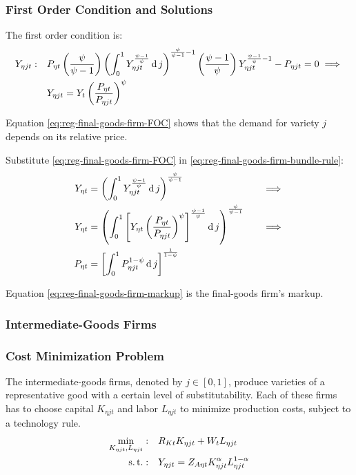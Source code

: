 \documentclass[../thesis.tex]{subfiles}
\begin{document}
\subsubsection*{First Order Condition and Solutions}

The first order condition is:
\begin{align}
	Y_{\eta jt}:\quad & P_{\eta t} \left( \frac{\psi}{\psi-1} \right) \left( \int_{0}^{1} Y_{\eta jt}^{\frac{\psi-1}{\psi}} \operatorname{d} j \right)^{\frac{\psi}{\psi-1}-1} \left( \frac{\psi-1}{\psi} \right) Y_{\eta jt}^{\frac{\psi-1}{\psi}-1} - P_{\eta jt} = 0 \implies \nonumber \\
	\label{eq:reg-final-goods-firm-FOC}
	& Y_{\eta jt} = Y_{t} \left( \frac{P_{\eta t}}{P_{\eta jt}} \right)^{\psi}
\end{align}

Equation \ref{eq:reg-final-goods-firm-FOC} shows that the demand for variety $j$ depends on its relative price. 

Substitute \ref{eq:reg-final-goods-firm-FOC} in \ref{eq:reg-final-goods-firm-bundle-rule}:
\begin{alignat}{2}
	Y_{\eta t} & = \left( \int_{0}^{1} Y_{\eta jt}^{\frac{\psi-1}{\psi}} \operatorname{d} j \right)^{\frac{\psi}{\psi-1}} &\implies \nonumber \\
	Y_{\eta t} & = \left( \int_{0}^{1} \left[ Y_{\eta t} \left( \frac{P_{\eta t}}{P_{\eta jt}} \right)^{\psi} \right]^{\frac{\psi-1}{\psi}} \operatorname{d} j \right)^{\frac{\psi}{\psi-1}} \quad &\implies \nonumber \\
	P_{\eta t} & = \left[ \int_{0}^{1} P_{\eta jt}^{1-\psi} \operatorname{d} j \right]^{\frac{1}{1-\psi}} \label{eq:reg-final-goods-firm-markup}
\end{alignat}

Equation \ref{eq:reg-final-goods-firm-markup} is the final-goods firm's markup.


\subsubsection{Intermediate-Goods Firms}

\subsubsection*{Cost Minimization Problem}

The intermediate-goods firms, denoted by $j \in [0,1]$, produce varieties of a representative good with a certain level of substitutability. Each of these firms has to choose capital $K_{\eta jt}$ and labor $L_{\eta jt}$ to minimize production costs, subject to a technology rule.
\begin{align}
	\label{eq:reg-int-good-firm-total-cost}
	\min_{K_{\eta jt}, L_{\eta jt}}: \quad & R_{Kt} K_{\eta jt} + W_t L_{\eta jt} \\
	\label{eq:reg-int-good-firm-production-function}
	\operatorname{s.t.}: \quad & Y_{\eta jt} = Z_{A\eta t} K_{\eta jt}^{\alpha_{}} L_{\eta jt}^{1-{\alpha_{}}}
\end{align}
\end{document}
